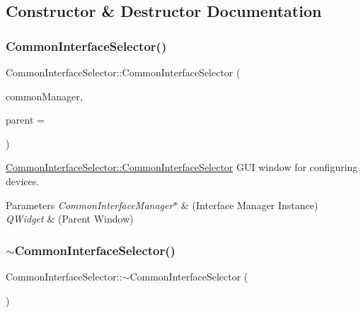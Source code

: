 \subsection{Constructor \& Destructor Documentation}
\hypertarget{class_common_interface_selector_a46da3e73aa0868810dbd80a42281a6c8}{}\label{class_common_interface_selector_a46da3e73aa0868810dbd80a42281a6c8} 
\subsubsection{\texorpdfstring{Common\+Interface\+Selector()}{CommonInterfaceSelector()}}
{\footnotesize\ttfamily Common\+Interface\+Selector\+::\+Common\+Interface\+Selector (\begin{DoxyParamCaption}\item[{\hyperlink{class_common_interface_manager}{Common\+Interface\+Manager} $\ast$}]{common\+Manager,  }\item[{Q\+Widget $\ast$}]{parent = {} }\end{DoxyParamCaption})\hspace{0.3cm}{\ttfamily [explicit]}}



\hyperlink{class_common_interface_selector_a46da3e73aa0868810dbd80a42281a6c8}{Common\+Interface\+Selector\+::\+Common\+Interface\+Selector} G\+UI window for configuring devices. 


\begin{DoxyParams}{Parameters}
{\em Common\+Interface\+Manager$\ast$} & (Interface Manager Instance) \\
\hline
{\em Q\+Widget} & (Parent Window) \\
\hline
\end{DoxyParams}
\hypertarget{class_common_interface_selector_acee1f5895e8678895f18edb5941f9160}{}\label{class_common_interface_selector_acee1f5895e8678895f18edb5941f9160} 
\subsubsection{\texorpdfstring{$\sim$\+Common\+Interface\+Selector()}{~CommonInterfaceSelector()}}
{\footnotesize\ttfamily Common\+Interface\+Selector\+::$\sim$\+Common\+Interface\+Selector (\begin{DoxyParamCaption}{ }\end{DoxyParamCaption})}



